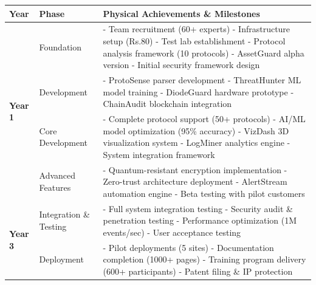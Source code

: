\documentclass[12pt,a4paper]{article}
\newcommand{\lakhs}{\text{ Lakhs}}
\begin{document}
\begin{longtable}{|p{2cm}|p{4cm}|p{8cm}|}
\hline
\rowcolor{lightblue}
\textbf{Year} & \textbf{Phase} & \textbf{Physical Achievements \& Milestones} \\
\hline
\endhead

\multirow{4}{*}{\textbf{Year 1}} & Foundation & 
- Team recruitment (60+ experts)
- Infrastructure setup (Rs.80\lakhs)
- Test lab establishment
- Protocol analysis framework (10 protocols)
- AssetGuard alpha version
- Initial security framework design \\
\cline{2-3}
& Development & 
- ProtoSense parser development
- ThreatHunter ML model training
- DiodeGuard hardware prototype
- ChainAudit blockchain integration \\
\hline

\multirow{4}{*}{\textbf{Year 2}} & Core Development & 
- Complete protocol support (50+ protocols)
- AI/ML model optimization (95\% accuracy)
- VizDash 3D visualization system
- LogMiner analytics engine
- System integration framework \\
\cline{2-3}
& Advanced Features & 
- Quantum-resistant encryption implementation
- Zero-trust architecture deployment
- AlertStream automation engine
- Beta testing with pilot customers \\
\hline

\multirow{4}{*}{\textbf{Year 3}} & Integration \& Testing & 
- Full system integration testing
- Security audit \& penetration testing
- Performance optimization (1M events/sec)
- User acceptance testing \\
\cline{2-3}
& Deployment & 
- Pilot deployments (5 sites)
- Documentation completion (1000+ pages)
- Training program delivery (600+ participants)
- Patent filing \& IP protection \\
\hline

\end{longtable}
\end{document}
